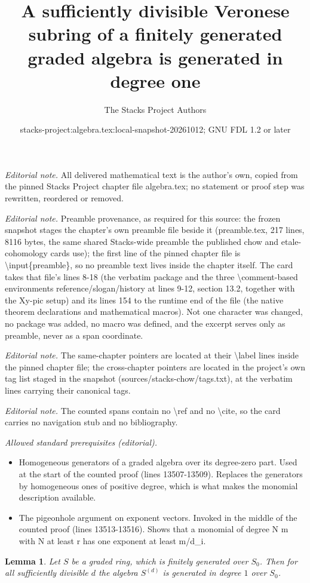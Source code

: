 \documentclass[10pt,a4paper]{amsart}
\title{A sufficiently divisible Veronese subring of a finitely generated graded algebra is generated in degree one}
\author{The Stacks Project Authors}
\date{stacks-project:algebra.tex:local-snapshot-20261012; GNU FDL 1.2 or later}
\theoremstyle{plain}
\newtheorem{lemma}[subsection]{Lemma}
\theoremstyle{definition}
\theoremstyle{remark}
\numberwithin{equation}{subsection}
\begin{document}
\maketitle
\noindent\textit{Editorial note.} All delivered mathematical text is the author's own, copied from the pinned Stacks Project chapter file algebra.tex; no statement or proof step was rewritten, reordered or removed.\par\medskip
\noindent\textit{Editorial note.} Preamble provenance, as required for this source: the frozen snapshot stages the chapter's own preamble file beside it (preamble.tex, 217 lines, 8116 bytes, the same shared Stacks-wide preamble the published chow and etale-cohomology cards use); the first line of the pinned chapter file is \textbackslash{}input\{preamble\}, so no preamble text lives inside the chapter itself. The card takes that file's lines 8-18 (the verbatim package and the three \textbackslash{}comment-based environments reference/slogan/history at lines 9-12, section 13.2, together with the Xy-pic setup) and its lines 154 to the runtime end of the file (the native theorem declarations and mathematical macros). Not one character was changed, no package was added, no macro was defined, and the excerpt serves only as preamble, never as a span coordinate.\par\medskip
\noindent\textit{Editorial note.} The same-chapter pointers are located at their \textbackslash{}label lines inside the pinned chapter file; the cross-chapter pointers are located in the project's own tag list staged in the snapshot (sources/stacks-chow/tags.txt), at the verbatim lines carrying their canonical tags.\par\medskip
\noindent\textit{Editorial note.} The counted spans contain no \textbackslash{}ref and no \textbackslash{}cite, so the card carries no navigation stub and no bibliography.\par\medskip
\noindent\textit{Allowed standard prerequisites (editorial).}\begin{itemize}
\item Homogeneous generators of a graded algebra over its degree-zero part. Used at the start of the counted proof (lines 13507-13509). Replaces the generators by homogeneous ones of positive degree, which is what makes the monomial description available.
\item The pigeonhole argument on exponent vectors. Invoked in the middle of the counted proof (lines 13513-13516). Shows that a monomial of degree N m with N at least r has one exponent at least m/d\_i.
\end{itemize}\medskip
\begin{lemma}
\label{lemma-uple-generated-degree-1}
Let $S$ be a graded ring, which is finitely generated over $S_0$.
Then for all sufficiently divisible $d$ the algebra
$S^{(d)}$ is generated in degree $1$ over $S_0$.
\end{lemma}
\end{document}
